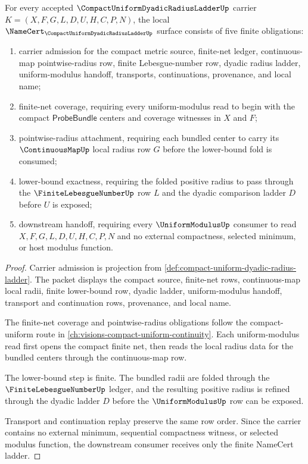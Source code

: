 \begin{theorem}
\label{thm:compact-uniform-dyadic-radius-ladder-namecert-obligations}
For every accepted $\CompactUniformDyadicRadiusLadderUp$ carrier $K=(X,F,G,L,D,U,H,C,P,N)$, the local $\NameCert_{\CompactUniformDyadicRadiusLadderUp}$ surface consists of five finite obligations:
\begin{enumerate}
\item carrier admission for the compact metric source, finite-net ledger, continuous-map pointwise-radius row, finite Lebesgue-number row, dyadic radius ladder, uniform-modulus handoff, transports, continuations, provenance, and local name;
\item finite-net coverage, requiring every uniform-modulus read to begin with the compact $\mathsf{ProbeBundle}$ centers and coverage witnesses in $X$ and $F$;
\item pointwise-radius attachment, requiring each bundled center to carry its $\ContinuousMapUp$ local radius row $G$ before the lower-bound fold is consumed;
\item lower-bound exactness, requiring the folded positive radius to pass through the $\FiniteLebesgueNumberUp$ row $L$ and the dyadic comparison ladder $D$ before $U$ is exposed;
\item downstream handoff, requiring every $\UniformModulusUp$ consumer to read $X,F,G,L,D,U,H,C,P,N$ and no external compactness, selected minimum, or host modulus function.
\end{enumerate}
\end{theorem}
\begin{proof}
Carrier admission is projection from \autoref{def:compact-uniform-dyadic-radius-ladder}. The packet displays the compact source, finite-net rows, continuous-map local radii, finite lower-bound row, dyadic ladder, uniform-modulus handoff, transport and continuation rows, provenance, and local name.

The finite-net coverage and pointwise-radius obligations follow the compact-uniform route in \autoref{ch:visions-compact-uniform-continuity}. Each uniform-modulus read first opens the compact finite net, then reads the local radius data for the bundled centers through the continuous-map row.

The lower-bound step is finite. The bundled radii are folded through the $\FiniteLebesgueNumberUp$ ledger, and the resulting positive radius is refined through the dyadic ladder $D$ before the $\UniformModulusUp$ row can be exposed.

Transport and continuation replay preserve the same row order. Since the carrier contains no external minimum, sequential compactness witness, or selected modulus function, the downstream consumer receives only the finite NameCert ladder.
\end{proof}

